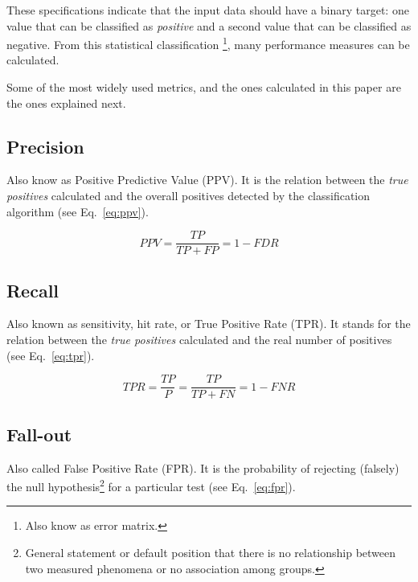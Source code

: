 These specifications indicate that the input data should have a binary target: 
one value that can be classified as \textit{positive} and a second value that
can be classified as negative. From this statistical classification
\footnote{Also know as error matrix.}, many performance measures can be 
calculated.

Some of the most widely used metrics, and the ones calculated in this paper are 
the ones explained next.

\subsection{Precision}    
 
Also know as Positive Predictive Value (PPV). It is the relation 
between the \textit{true positives} calculated and the overall positives
detected by the classification algorithm (see Eq.~\ref{eq:ppv}).
 
\begin{equation}\label{eq:ppv}
    PPV = \frac{TP}{TP + FP} = 1 - FDR
\end{equation}

\subsection{Recall} 

Also known as sensitivity, hit rate, or True Positive 
Rate (TPR). It stands for the relation between the \textit{true positives}
calculated and the real number of positives (see Eq.~\ref{eq:tpr}).

\begin{equation}\label{eq:tpr}
    TPR = \frac{TP}{P} = \frac{TP}{TP + FN} = 1 - FNR
\end{equation}

\subsection{Fall-out}

Also called False Positive Rate (FPR). It is the probability of rejecting 
(falsely) the null hypothesis\footnote{General statement or default position
that there is no relationship between two measured phenomena or no
association among groups.} for a particular test (see Eq.~\ref{eq:fpr}).

